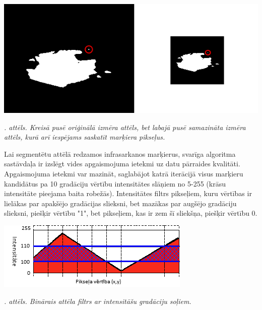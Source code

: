 \documentclass[12pt, a4paper, oneside, openright]{article}
\renewcommand{\thecimages}{\arabic{cimages}}
\begin{document}
\label{cimages:scaling}
\vspace{10pt}
\begin{samepage}
\begin{center}
\includegraphics[width=1\columnwidth]{images/scaling.png}
\begin{center}
\footnotesize{
\textit{\thecimages. attēls. Kreisā pusē oriģinālā izmēra attēls, bet labajā pusē samazināta izmēra attēls, kurā arī iespējams saskatīt marķiera pikseļus.}}
\end{center}
\end{center}
\end{samepage}

\par
Lai segmentētu attēlā redzamos infrasarkanos marķierus, svarīga algoritma sastāvdaļa ir izslēgt vides apgaismojuma ietekmi
uz datu pārraides kvalitāti. Apgaismojuma ietekmi var mazināt, saglabājot katrā iterācijā visus marķieru kandidātus
pa 10 gradāciju vērtību intensitātes slāņiem no 5-255 (krāsu intensitāte pieejama baita robežās). 
Intensitātes filtrs pikseļiem, kuru vērtības ir lielākas par apakšējo gradācijas slieksni, bet mazākas par augšējo gradāciju slieksni, piešķir vērtību "1", bet pikseļiem, kas ir zem šī sliekšņa, piešķir vērtību 0.

\label{cimages:filter}
\vspace{10pt}
\begin{samepage}
\begin{center}
\includegraphics[width=0.5\columnwidth]{images/filter.png}
\begin{center}
\footnotesize{
\textit{\thecimages. attēls. Binārais attēla filtrs ar intensitāšu gradāciju soļiem.}}
\end{center}
\end{center}
\end{samepage}
\newpage
\end{document}
